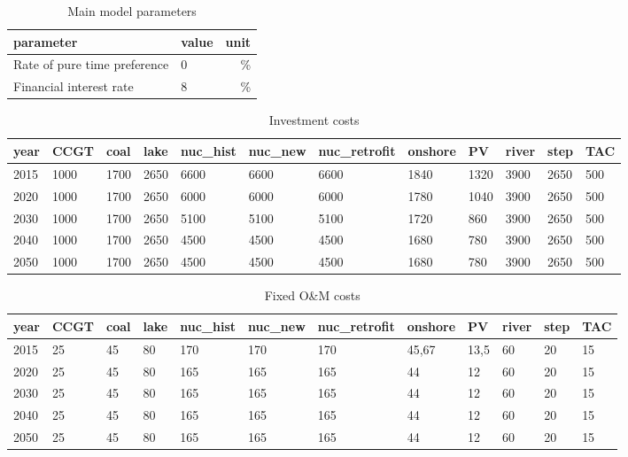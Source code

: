 \documentclass[authoryear]{elsarticle}
\begin{document}
\begin{table}[!ht]
	\centering
	\caption{Main model parameters}
	\begin{tabular}{llr}
		\toprule
		parameter&value&unit\\
		\midrule
		Rate of pure time preference &0&\%\\
		Financial interest rate&8&\%\\
		\bottomrule
	\end{tabular}
\end{table}

\begin{table}
	\centering
	\caption{Investment costs}
\label{tab:Investment _costs}
\small
	\begin{tabular}{llllllllllll}
		\toprule
		year & CCGT & coal & lake & nuc\_hist & nuc\_new & nuc\_retrofit & onshore & PV & river & step & TAC \\
		\midrule
		2015 & 1000 & 1700 & 2650 & 6600 & 6600 & 6600 & 1840 & 1320 & 3900 & 2650 & 500 \\
		2020 & 1000 & 1700 & 2650 & 6000 & 6000 & 6000 & 1780 & 1040 & 3900 & 2650 & 500 \\
		2030 & 1000 & 1700 & 2650 & 5100 & 5100 & 5100 & 1720 & 860 & 3900 & 2650 & 500 \\
		2040 & 1000 & 1700 & 2650 & 4500 & 4500 & 4500 & 1680 & 780 & 3900 & 2650 & 500 \\
		2050 & 1000 & 1700 & 2650 & 4500 & 4500 & 4500 & 1680 & 780 & 3900 & 2650 & 500 \\
		\bottomrule
	\end{tabular}
\end{table}


\begin{table}
	\centering
	\caption{Fixed O\&M costs}
	\label{tab:OM_costs}
	\small
	\begin{tabular}{llllllllllll}
		\toprule
		year & CCGT & coal & lake & nuc\_hist & nuc\_new & nuc\_retrofit & onshore & PV & river & step & TAC \\
		\midrule
		2015 & 25 & 45 & 80 & 170 & 170 & 170 & 45,67 & 13,5 & 60 & 20 & 15 \\
		2020 & 25 & 45 & 80 & 165 & 165 & 165 & 44 & 12 & 60 & 20 & 15 \\
		2030 & 25 & 45 & 80 & 165 & 165 & 165 & 44 & 12 & 60 & 20 & 15 \\
		2040 & 25 & 45 & 80 & 165 & 165 & 165 & 44 & 12 & 60 & 20 & 15 \\
		2050 & 25 & 45 & 80 & 165 & 165 & 165 & 44 & 12 & 60 & 20 & 15 \\
		\bottomrule
	\end{tabular}
\end{table}
\end{document}
